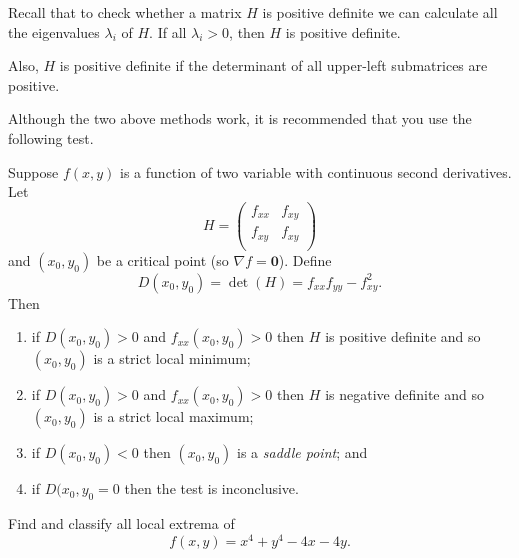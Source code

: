 
Recall that to check whether a matrix $H$ is positive definite 
we can calculate all the eigenvalues $\lambda_i$ of $H$.
If all $\lambda_i > 0$, then $H$ is positive definite.

Also, $H$ is positive definite if the determinant of all upper-left submatrices are positive.

Although the two above methods work, 
it is recommended that you use the following test.

\begin{proposition}
    Suppose $f(x, y)$ is a function of two variable with 
    continuous second derivatives.
    Let
    \[ H =
        \begin{pmatrix}
            f_{xx} & f_{xy} \\
            f_{xy} & f_{xy} \\
        \end{pmatrix} \]
    and $(x_0, y_0)$ be a critical point (so $\nabla f = \bm 0$).
    Define 
    \[ D(x_0, y_0) = \det{(H)} = f_{xx} f_{yy} - f_{xy}^2. \]
    Then
    \begin{enumerate}
        \item if $D(x_0, y_0) > 0$ and $f_{xx}(x_0, y_0) > 0$ then
            $H$ is positive definite and so 
            $(x_0, y_0)$ is a strict local minimum;
        
        \item if $D(x_0, y_0) > 0$ and $f_{xx}(x_0, y_0) > 0$ then
            $H$ is negative definite and so
            $(x_0, y_0)$ is a strict local maximum;
            
        \item if $D(x_0, y_0) < 0$ then 
            $(x_0, y_0)$ is a \emph{saddle point}; and
        
        \item if $D(x_0, y_0 = 0$ then the test is inconclusive.
    \end{enumerate}
\end{proposition}

\begin{example}
    Find and classify all local extrema of
    \[ f(x, y) = x^4 + y^4 - 4x - 4y. \]
\end{example}

